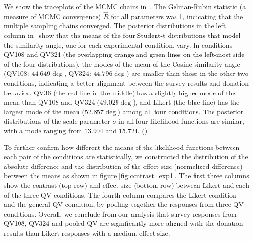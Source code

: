 We show the traceplots of the MCMC chains in~. The Gelman-Rubin statistic (a measure of MCMC convergence) $\hat{R}$ for all parameters was 1, indicating that the multiple sampling chains converged.
The posterior distributions in the left column in~ show that the means of the four Student-t distributions that model the similarity angle, one for each experimental condition, vary. 
In conditions QV108 and QV324 (the overlapping orange and green lines on the left-most side of the four distributions),
the modes of the mean of the Cosine similarity angle 
(QV108: $44.649 \deg$, QV324: $44.796 \deg$) 
are smaller than those in the other two conditions, 
indicating a better alignment 
between the survey results and donation behavior. 
QV36 (the red line in the middle) has a slightly higher mode of the mean than QV108 and QV324 ($49.029 \deg$), and Likert (the blue line) has the largest mode of the mean ($52.857 \deg$) 
among all four conditions. 
The posterior distributions of the scale parameter $\sigma$
in all four likelihood functions are similar, 
with a mode ranging from $13.904$ and $15.724$. 
()

To further confirm how different the means 
of the likelihood functions 
between each pair of the conditions are statistically, 
we constructed the distribution 
of the absolute difference and 
the distribution of the effect size 
(normalized difference) 
between the means as shown in figure \ref{fig:contrast_exp1}. The first three columns show the contrast (top row) and effect size (bottom row) between Likert and each of the three QV conditions. The fourth column compares the Likert condition and the general QV condition, by pooling together the responses from three QV conditions. Overall, we conclude from our analysis that survey responses from QV108, QV324 and pooled QV are significantly more aligned with the donation results than Likert responses with a medium effect size. 

